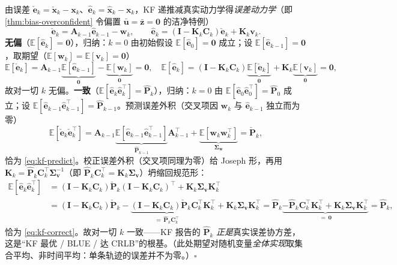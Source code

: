 \begin{derivation}\label{der:kf-unbiased-consistent}
由误差 $\check{\mathbf{e}}_k=\check{\mathbf{x}}_k-\mathbf{x}_k$、$\hat{\mathbf{e}}_k=\hat{\mathbf{x}}_k-\mathbf{x}_k$，KF 递推减真实动力学得\emph{误差动力学}（即 \cref{thm:bias-overconfident} 令偏置 $\bar{\mathbf{u}}=\bar{\mathbf{z}}=\mathbf{0}$ 的洁净特例）
\[
  \check{\mathbf{e}}_k=\mathbf{A}_{k-1}\hat{\mathbf{e}}_{k-1}-\mathbf{w}_k,\qquad
  \hat{\mathbf{e}}_k=(\mathbf{I}-\mathbf{K}_k\mathbf{C}_k)\check{\mathbf{e}}_k+\mathbf{K}_k\mathbf{v}_k.
\]
\textbf{无偏}（$\mathbb{E}[\hat{\mathbf{e}}_k]=\mathbf{0}$），归纳：$k=0$ 由初始假设 $\mathbb{E}[\hat{\mathbf{e}}_0]=\mathbf{0}$ 成立；设 $\mathbb{E}[\hat{\mathbf{e}}_{k-1}]=\mathbf{0}$，取期望（$\mathbb{E}[\mathbf{w}_k]=\mathbb{E}[\mathbf{v}_k]=\mathbf{0}$）
\[
  \mathbb{E}[\check{\mathbf{e}}_k]=\mathbf{A}_{k-1}\underbrace{\mathbb{E}[\hat{\mathbf{e}}_{k-1}]}_{\mathbf{0}}-\underbrace{\mathbb{E}[\mathbf{w}_k]}_{\mathbf{0}}=\mathbf{0},\quad
  \mathbb{E}[\hat{\mathbf{e}}_k]=(\mathbf{I}-\mathbf{K}_k\mathbf{C}_k)\underbrace{\mathbb{E}[\check{\mathbf{e}}_k]}_{\mathbf{0}}+\mathbf{K}_k\underbrace{\mathbb{E}[\mathbf{v}_k]}_{\mathbf{0}}=\mathbf{0},
\]
故对一切 $k$ 无偏。\textbf{一致}（$\mathbb{E}[\hat{\mathbf{e}}_k\hat{\mathbf{e}}_k^\top]=\hat{\mathbf{P}}_k$），归纳：$k=0$ 由 $\mathbb{E}[\hat{\mathbf{e}}_0\hat{\mathbf{e}}_0^\top]=\hat{\mathbf{P}}_0$ 成立；设 $\mathbb{E}[\hat{\mathbf{e}}_{k-1}\hat{\mathbf{e}}_{k-1}^\top]=\hat{\mathbf{P}}_{k-1}$。预测误差外积（交叉项因 $\mathbf{w}_k$ 与 $\hat{\mathbf{e}}_{k-1}$ 独立而为零）
\[
  \mathbb{E}[\check{\mathbf{e}}_k\check{\mathbf{e}}_k^\top]=\mathbf{A}_{k-1}\underbrace{\mathbb{E}[\hat{\mathbf{e}}_{k-1}\hat{\mathbf{e}}_{k-1}^\top]}_{\hat{\mathbf{P}}_{k-1}}\mathbf{A}_{k-1}^\top+\underbrace{\mathbb{E}[\mathbf{w}_k\mathbf{w}_k^\top]}_{\boldsymbol{\Sigma}_{\mathbf{w}}}=\check{\mathbf{P}}_k,
\]
恰为 \cref{eq:kf-predict}。校正误差外积（交叉项同理为零）给 Joseph 形，再用 $\mathbf{K}_k=\hat{\mathbf{P}}_k\mathbf{C}_k^\top\boldsymbol{\Sigma}_{\mathbf{v}}^{-1}$（即 $\hat{\mathbf{P}}_k\mathbf{C}_k^\top=\mathbf{K}_k\boldsymbol{\Sigma}_{\mathbf{v}}$）坍缩回规范形：
\begin{align*}
  \mathbb{E}[\hat{\mathbf{e}}_k\hat{\mathbf{e}}_k^\top]
  &=(\mathbf{I}-\mathbf{K}_k\mathbf{C}_k)\check{\mathbf{P}}_k(\mathbf{I}-\mathbf{K}_k\mathbf{C}_k)^\top+\mathbf{K}_k\boldsymbol{\Sigma}_{\mathbf{v}}\mathbf{K}_k^\top\\
  &=(\mathbf{I}-\mathbf{K}_k\mathbf{C}_k)\check{\mathbf{P}}_k-\underbrace{(\mathbf{I}-\mathbf{K}_k\mathbf{C}_k)\check{\mathbf{P}}_k\mathbf{C}_k^\top}_{=\,\hat{\mathbf{P}}_k\mathbf{C}_k^\top}\mathbf{K}_k^\top+\mathbf{K}_k\boldsymbol{\Sigma}_{\mathbf{v}}\mathbf{K}_k^\top
  =\hat{\mathbf{P}}_k\underbrace{-\hat{\mathbf{P}}_k\mathbf{C}_k^\top\mathbf{K}_k^\top+\mathbf{K}_k\boldsymbol{\Sigma}_{\mathbf{v}}\mathbf{K}_k^\top}_{=\,\mathbf{0}}=\hat{\mathbf{P}}_k,
\end{align*}
恰为 \cref{eq:kf-correct}。故对一切 $k$ 一致——KF 报告的 $\hat{\mathbf{P}}_k$ \emph{正是}真实误差协方差，这是“KF 最优 / BLUE / 达 CRLB”的根基。（此处期望对随机变量\emph{全体实现}取集合平均、非时间平均：单条轨迹的误差并不为零。）\hfill$\square$
\end{derivation}

